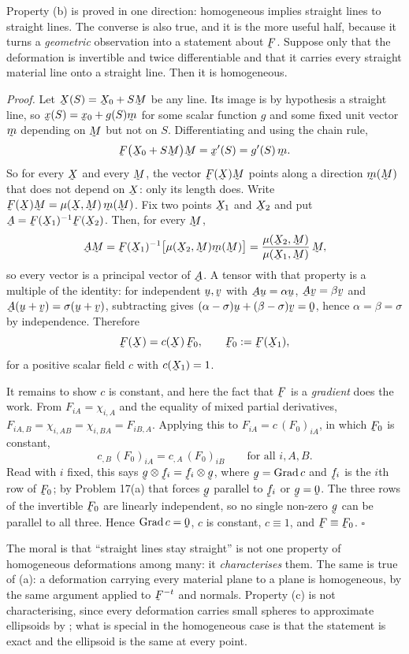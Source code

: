 \begin{remark}
\label{rem:linesconverse}
Property (b) is proved in one direction: homogeneous implies straight lines
to straight lines. The converse is also true, and it is the more useful
half, because it turns a \emph{geometric} observation into a statement
about $\bF$. Suppose only that the deformation is invertible and twice
differentiable and that it carries every straight material line onto a
straight line. Then it is homogeneous.

\emph{Proof.} Let $\bX(S)=\bX_{0}+S\bM$ be any line. Its image is by
hypothesis a straight line, so
$\bx(S)=\bx_{0}+g(S)\bm$ for some scalar function $g$ and some fixed unit
vector $\bm$ depending on $\bM$ but not on $S$. Differentiating and using
the chain rule,
\[
   \bF\big(\bX_{0}+S\bM\big)\bM=\bx'(S)=g'(S)\,\bm .
\]
So for every $\bX$ and every $\bM$, the vector $\bF(\bX)\bM$ points along a
direction $\bm(\bM)$ that does not depend on $\bX$: only its length does.
Write $\bF(\bX)\bM=\mu(\bX,\bM)\,\bm(\bM)$. Fix two points $\bX_{1}$ and
$\bX_{2}$ and put $\bA=\bF(\bX_{1})^{-1}\bF(\bX_{2})$. Then, for every
$\bM$,
\[
   \bA\bM=\bF(\bX_{1})^{-1}\big[\mu(\bX_{2},\bM)\bm(\bM)\big]
   =\frac{\mu(\bX_{2},\bM)}{\mu(\bX_{1},\bM)}\,\bM ,
\]
so every vector is a principal vector of $\bA$. A tensor with that
property is a multiple of the identity: for independent $\bu,\bv$ with
$\bA\bu=\alpha\bu$, $\bA\bv=\beta\bv$ and
$\bA(\bu+\bv)=\sigma(\bu+\bv)$, subtracting gives
$(\alpha-\sigma)\bu+(\beta-\sigma)\bv=\bze$, hence
$\alpha=\beta=\sigma$ by independence. Therefore
\[
   \bF(\bX)=c(\bX)\,\bF_{0},\qquad \bF_{0}:=\bF(\bX_{1}),
\]
for a positive scalar field $c$ with $c(\bX_{1})=1$.

It remains to show $c$ is constant, and here the fact that $\bF$ is a
\emph{gradient} does the work. From $F_{iA}=\chi_{i,A}$ and the equality of
mixed partial derivatives, $F_{iA,B}=\chi_{i,AB}=\chi_{i,BA}=F_{iB,A}$.
Applying this to $F_{iA}=c\,(F_{0})_{iA}$, in which $\bF_{0}$ is constant,
\[
   c_{,B}\,(F_{0})_{iA}=c_{,A}\,(F_{0})_{iB}
   \qquad\text{for all }i,A,B .
\]
Read with $i$ fixed, this says $\bg\otimes\bff_{i}=\bff_{i}\otimes\bg$,
where $\bg=\Grad c$ and $\bff_{i}$ is the $i$th row of $\bF_{0}$; by
Problem 17(a) that forces $\bg$ parallel to $\bff_{i}$ or $\bg=\bze$. The
three rows of the invertible $\bF_{0}$ are linearly independent, so no
single non-zero $\bg$ can be parallel to all three. Hence $\Grad c=\bze$,
$c$ is constant, $c\equiv1$, and $\bF\equiv\bF_{0}$. \hfill$\square$

The moral is that ``straight lines stay straight'' is not one property of
homogeneous deformations among many: it \emph{characterises} them. The same
is true of (a): a deformation carrying every material plane to a plane is
homogeneous, by the same argument applied to $\bF^{-t}$ and normals.
Property (c) is not characterising, since every deformation carries small
spheres to approximate ellipsoids by ; what is special in the
homogeneous case is that the statement is exact and the ellipsoid is the
same at every point.
\end{remark}

